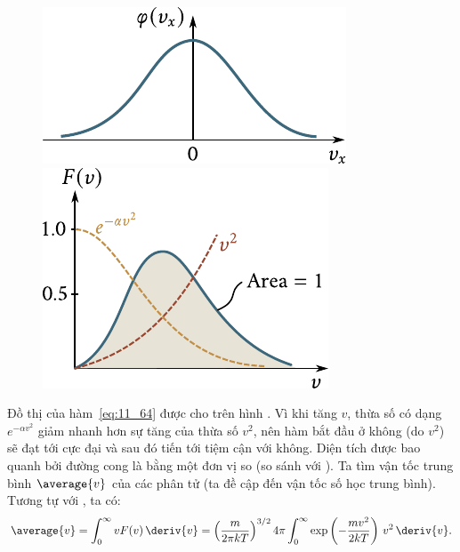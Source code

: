 \begin{figure}[!htb]
	\begin{minipage}[t]{0.5\linewidth}
		\begin{center}
			\includegraphics[scale=0.95]{figures/ch_11/fig_11_16.pdf}
			\caption[]{}
			\label{fig:11_16}
		\end{center}
	\end{minipage}
	\hspace{-0.05cm}
	\begin{minipage}[t]{0.5\linewidth}
		\begin{center}
			\includegraphics[scale=0.95]{figures/ch_11/fig_11_17.pdf}
			\caption[]{}
			\label{fig:11_17}
		\end{center}
	\end{minipage}
	\vspace{-0.7cm}
\end{figure}


Đồ thị của hàm~\eqref{eq:11_64} được cho trên hình . Vì khi tăng $v$, thừa số có dạng $e^{-\alpha v^2}$ giảm nhanh hơn sự tăng của thừa số $v^2$, nên hàm bắt đầu ở không (do $v^2$) sẽ đạt tới cực đại và sau đó tiến tới tiệm cận với không. Diện tích được bao quanh bởi đường cong là bằng một đơn vị so (so sánh với ).
Ta tìm vận tốc trung bình $\average{v}$ của các phân tử (ta đề cập đến vận tốc số học trung bình). Tương tự với  , ta có:
\begin{equation*}
	\average{v} = \int_{0}^{\infty} vF(v)\,\deriv{v} = \left(\frac{m}{2\pi kT}\right)^{3/2} 4\pi \int_{0}^{\infty} \exp\left(-\frac{mv^2}{2kT}\right)\,v^2\,\deriv{v}.
\end{equation*}

